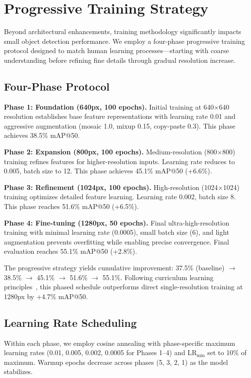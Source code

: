 \documentclass[preprint,12pt]{elsarticle}
\begin{document}
\section{Progressive Training Strategy}
\label{sec:training}

Beyond architectural enhancements, training methodology significantly impacts
small object detection performance. We employ a four-phase progressive training
protocol designed to match human learning processes---starting with coarse
understanding before refining fine details through gradual resolution increase.

\subsection{Four-Phase Protocol}

\textbf{Phase 1: Foundation (640px, 100 epochs).} Initial training at
640$\times$640 resolution establishes base feature representations with learning
rate 0.01 and aggressive augmentation (mosaic 1.0, mixup 0.15, copy-paste 0.3).
This phase achieves 38.5\% mAP@50.

\textbf{Phase 2: Expansion (800px, 100 epochs).} Medium-resolution
(800$\times$800) training refines features for higher-resolution inputs. Learning
rate reduces to 0.005, batch size to 12. This phase achieves 45.1\% mAP@50
(+6.6\%).

\textbf{Phase 3: Refinement (1024px, 100 epochs).} High-resolution
(1024$\times$1024) training optimizes detailed feature learning. Learning rate
0.002, batch size 8. This phase reaches 51.6\% mAP@50 (+6.5\%).

\textbf{Phase 4: Fine-tuning (1280px, 50 epochs).} Final ultra-high-resolution
training with minimal learning rate (0.0005), small batch size (6), and light
augmentation prevents overfitting while enabling precise convergence. Final
evaluation reaches 55.1\% mAP@50 (+2.8\%).

The progressive strategy yields cumulative improvement: 37.5\% (baseline)
$\to$ 38.5\% $\to$ 45.1\% $\to$ 51.6\% $\to$ 55.1\%. Following curriculum
learning principles~\cite{curriculum-learning}, this phased schedule outperforms
direct single-resolution training at 1280px by +4.7\% mAP@50.

\subsection{Learning Rate Scheduling}

Within each phase, we employ cosine annealing with phase-specific maximum learning
rates (0.01, 0.005, 0.002, 0.0005 for Phases 1--4) and
$\text{LR}_{\min}$ set to 10\% of maximum. Warmup epochs decrease across phases
(5, 3, 2, 1) as the model stabilizes.
\end{document}
